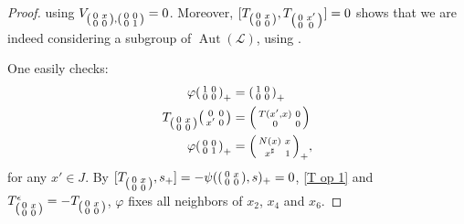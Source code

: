 \documentclass[oneside,a4paper]{amsart} %
\theoremstyle{definition}
\DeclareMathOperator{\Aut}{Aut}
\newcommand{\LL}{\mathcal{L}}
\numberwithin{equation}{section}
\begin{document}
\begin{proof}
	using $V_{\begin{psmallmatrix} 0&x\\0&0 \end{psmallmatrix},\begin{psmallmatrix} 0&0\\0&1 \end{psmallmatrix}}=0$.
	Moreover, $[T_{\begin{psmallmatrix} 0&x\\0&0 \end{psmallmatrix}},T_{\begin{psmallmatrix} 0&x'\\0&0 \end{psmallmatrix}}]=0$ shows that we are indeed considering a subgroup of $\Aut(\LL)$, using \cite[Lemma 3.1.3]{Boelaert2019}.
	
	One easily checks:
	\begin{align}
		\label{T op 1} \varphi\begin{psmallmatrix} 1&0\\0&0 \end{psmallmatrix}_+&=\begin{psmallmatrix} 1&0\\0&0 \end{psmallmatrix}_+\\ 
		 \label{T op 2} T_{\begin{psmallmatrix} 0&x\\0&0 \end{psmallmatrix}} \begin{psmallmatrix} 0&0\\x'&0 \end{psmallmatrix}&=\begin{psmallmatrix} T(x',x)&0\\0&0 \end{psmallmatrix}\\ 
		 \label{T op 3}\varphi \begin{psmallmatrix} 0&0\\0&1 \end{psmallmatrix}_+&=\begin{psmallmatrix} N(x)&x\\x^\sharp &1 \end{psmallmatrix}_+,
	\end{align}
	for any $x'\in J$.
	By $[T_{\begin{psmallmatrix} 0&x\\0&0 \end{psmallmatrix}},s_+]=-\psi (\begin{psmallmatrix} 0&x\\0&0 \end{psmallmatrix},s)_+=0$, \cref{T op 1} and $T_{\begin{psmallmatrix} 0&x\\0&0 \end{psmallmatrix}}^\epsilon=-T_{\begin{psmallmatrix} 0&x\\0&0 \end{psmallmatrix}}$, $\varphi$ fixes all neighbors of $x_2$, $x_4$ and $x_6$.

\end{proof}
\end{document}
